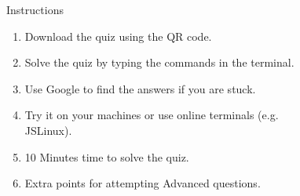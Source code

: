 \documentclass[aspectratio=169]{beamer}
\begin{document}


\begin{frame}
    \begin{columns}
        \begin{column}{0.6\textwidth}
            \begin{block}{Instructions}
                \begin{enumerate}
                    \item Download the quiz using the QR code.
                    \item Solve the quiz by typing the commands in the terminal.
                    \item Use Google to find the answers if you are stuck.
                    \item Try it on your machines or use online terminals (e.g. JSLinux).
                    \item 10 Minutes time to solve the quiz.
                    \item Extra points for attempting Advanced questions.
                \end{enumerate}
            \end{block}
        \end{column}
        \begin{column}{0.4\textwidth}
            \begin{figure}[htpb]
                \begin{center}

\end{center}
\end{figure}
\end{column}
\end{columns}
\end{frame}
\end{document}

